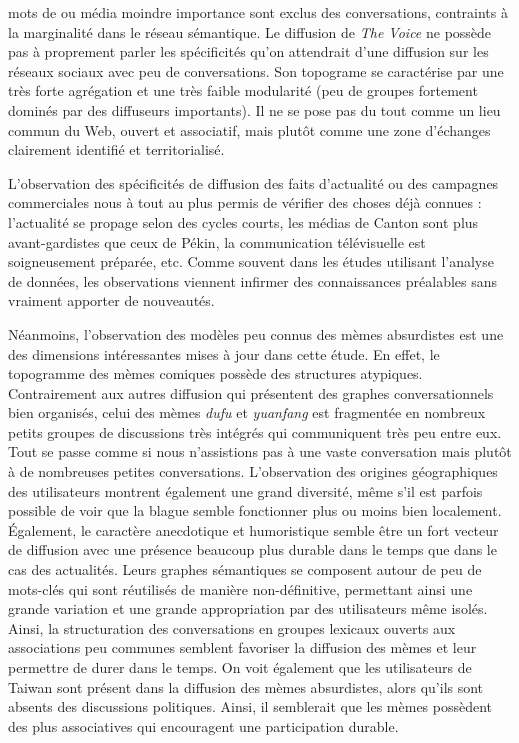mots de ou média moindre importance sont exclus des conversations, contraints à la marginalité dans le réseau sémantique. Le diffusion de \textit{The Voice} ne possède pas à proprement parler les spécificités qu'on attendrait d'une diffusion sur les réseaux sociaux avec peu de conversations. Son topograme se caractérise par une très forte agrégation et une très faible modularité (peu de groupes fortement dominés par des diffuseurs importants). Il ne se pose pas du tout comme un lieu commun du Web, ouvert et associatif,  mais plut\^ot comme une zone d'échanges clairement identifié et territorialisé. 

L'observation des spécificités de diffusion des faits d'actualité ou des campagnes commerciales nous à tout au plus permis de vérifier des choses déjà connues : l'actualité se propage selon des cycles courts, les médias de Canton sont plus avant-gardistes que ceux de Pékin, la communication télévisuelle est soigneusement préparée, etc. Comme souvent dans les études utilisant l'analyse de données, les observations viennent infirmer des connaissances préalables sans vraiment apporter de nouveautés. 

Néanmoins, l'observation des modèles peu connus des mèmes absurdistes est une des dimensions intéressantes mises à jour dans cette étude. En effet, le topogramme des mèmes comiques possède des structures atypiques. Contrairement aux autres diffusion qui présentent des graphes conversationnels bien organisés, celui des mèmes \textit{dufu} et \textit{yuanfang} est fragmentée en nombreux petits groupes de discussions très intégrés qui communiquent très peu entre eux. Tout se passe comme si nous n'assistions pas à une vaste conversation mais plutôt à de nombreuses petites conversations. L'observation des origines géographiques des utilisateurs montrent également une grand diversité, même s'il est parfois possible de voir que la blague semble fonctionner plus ou moins bien localement. Également, le caractère anecdotique et humoristique semble être un fort vecteur de diffusion avec une présence beaucoup plus durable dans le temps que dans le cas des actualités. Leurs graphes sémantiques se composent autour de peu de mots-clés qui sont réutilisés de manière non-définitive, permettant ainsi une grande variation et une grande appropriation par des utilisateurs même isolés. Ainsi, la structuration des conversations en groupes lexicaux ouverts aux associations peu communes semblent favoriser la diffusion des mèmes et leur permettre de durer dans le temps. On voit également que les utilisateurs de Taiwan sont présent dans la diffusion des mèmes absurdistes, alors qu'ils sont absents des discussions politiques. Ainsi, il semblerait que les mèmes possèdent des plus associatives qui encouragent une participation durable.

